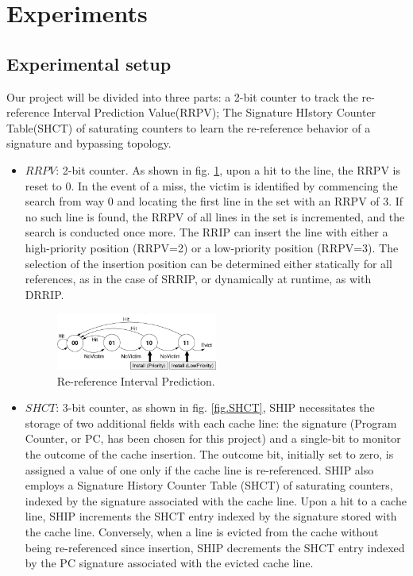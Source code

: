 
\section{Experiments}
\subsection{Experimental setup}
Our project will be divided into three parts: a 2-bit counter to track the re-reference Interval Prediction Value(RRPV); The Signature HIstory Counter Table(SHCT) of saturating counters to learn the re-reference behavior of a signature and bypassing topology.
\begin{itemize}
    \item \(RRPV\): 2-bit counter. As shown in fig. \ref{fig.RRPV}, upon a hit to the line, the RRPV is reset to 0. In the event of a miss, the victim is identified by commencing the search from way 0 and locating the first line in the set with an RRPV of 3. If no such line is found, the RRPV of all lines in the set is incremented, and the search is conducted once more. The RRIP can insert the line with either a high-priority position (RRPV=2) or a low-priority position (RRPV=3). The selection of the insertion position can be determined either statically for all references, as in the case of SRRIP, or dynamically at runtime, as with DRRIP. 
    
\begin{figure}[htbp]
\centering
\includegraphics[width=0.5\textwidth]{figs/RRPV.png}
\caption{Re-reference Interval Prediction.}
\label{fig.RRPV}
\end{figure}

    \item \(SHCT\): 3-bit counter, as shown in fig. \ref{fig.SHCT}, SHIP necessitates the storage of two additional fields with each cache line: the signature (Program Counter, or PC, has been chosen for this project) and a single-bit to monitor the outcome of the cache insertion. The outcome bit, initially set to zero, is assigned a value of one only if the cache line is re-referenced. SHIP also employs a Signature History Counter Table (SHCT) of saturating counters, indexed by the signature associated with the cache line. Upon a hit to a cache line, SHIP increments the SHCT entry indexed by the signature stored with the cache line. Conversely, when a line is evicted from the cache without being re-referenced since insertion, SHIP decrements the SHCT entry indexed by the PC signature associated with the evicted cache line.
    

\end{itemize}
